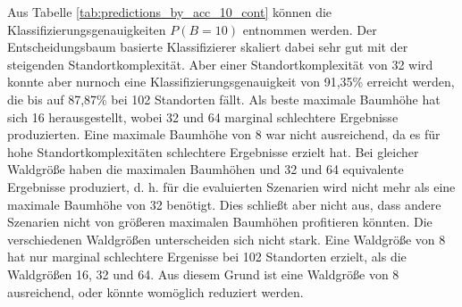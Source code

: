 Aus Tabelle \ref{tab:predictions_by_acc_10_cont} können die Klassifizierungsgenauigkeiten $P(B=10)$ entnommen werden.
Der Entscheidungsbaum basierte Klassifizierer skaliert dabei sehr gut mit der steigenden Standortkomplexität.
Aber einer Standortkomplexität von 32 wird konnte aber nurnoch eine Klassifizierungsgenauigkeit von 91,35\% erreicht werden, die bis auf 87,87\% bei 102 Standorten fällt.
Als beste maximale Baumhöhe hat sich 16 herausgestellt, wobei 32 und 64 marginal schlechtere Ergebnisse produzierten.
Eine maximale Baumhöhe von 8 war nicht ausreichend, da es für hohe Standortkomplexitäten schlechtere Ergebnisse erzielt hat.
Bei gleicher Waldgröße haben die maximalen Baumhöhen und 32 und 64 equivalente Ergebnisse produziert,
d. h. für die evaluierten Szenarien wird nicht mehr als eine maximale Baumhöhe von 32 benötigt.
Dies schließt aber nicht aus, dass andere Szenarien nicht von größeren maximalen Baumhöhen profitieren könnten.
Die verschiedenen Waldgrößen unterscheiden sich nicht stark.
Eine Waldgröße von 8 hat nur marginal schlechtere Ergenisse bei 102 Standorten erzielt, als die Waldgrößen 16, 32 und 64.
Aus diesem Grund ist eine Waldgröße von 8 ausreichend, oder könnte womöglich reduziert werden.
